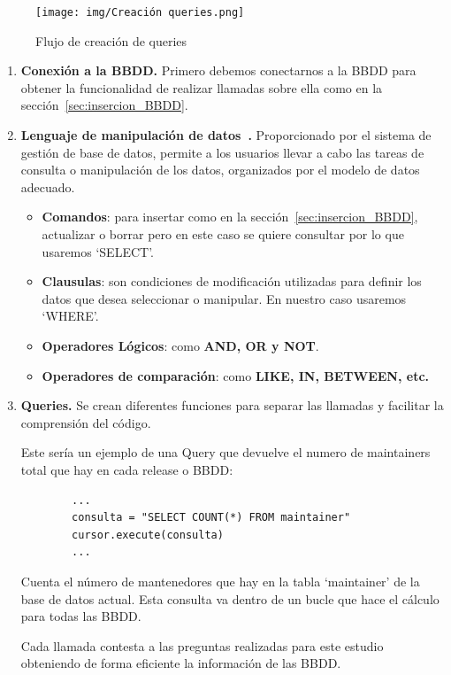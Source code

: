 \documentclass[a4paper, 12pt]{book}
\begin{document}
\begin{figure}
	\centering
	\texttt{[image: img/Creación queries.png]}
	\caption{Flujo de creación de queries}
	\label{fig:flujo creacion queries}
\end{figure}

\begin{enumerate}
	\item \textbf{Conexión a la BBDD.} Primero debemos conectarnos a la BBDD para obtener la funcionalidad de realizar llamadas sobre ella como en la sección~\ref{sec:insercion_BBDD}.
	
	\item \textbf{Lenguaje de manipulación de datos~\cite{geotalleres:_sql}.} Proporcionado por el sistema de gestión de base de datos, permite a los usuarios llevar a cabo las tareas de consulta o manipulación de los datos, organizados por el modelo de datos adecuado. 

	\begin{itemize}
		\item \textbf{Comandos}: para insertar como en la sección~\ref{sec:insercion_BBDD}, actualizar o borrar pero en este caso se quiere consultar por lo que usaremos `SELECT'.
		
		\item \textbf{Clausulas}: son condiciones de modificación utilizadas para definir los datos que desea seleccionar o manipular. En nuestro caso usaremos `WHERE'.
		
		\item \textbf{Operadores Lógicos}: como \textbf{AND, OR y NOT}.
		
		\item \textbf{Operadores de comparación}: como \textbf{LIKE, IN, BETWEEN, etc.}
		
	\end{itemize}
	
	\item \textbf{Queries.} Se crean diferentes funciones para separar las llamadas y facilitar la comprensión del código. 
	
	
	
	Este sería un ejemplo de una Query que devuelve el numero de maintainers total que hay en cada release o BBDD:
	
	\begin{verbatim}
		...
		consulta = "SELECT COUNT(*) FROM maintainer"
		cursor.execute(consulta)
		...
	\end{verbatim} 
	
	Cuenta el número de mantenedores que hay en la tabla `maintainer' de la base de datos actual. Esta consulta va dentro de un bucle que hace el cálculo para todas las BBDD.
	
	Cada llamada contesta a las preguntas realizadas para este estudio obteniendo de forma eficiente la información de las BBDD.
	 
\end{enumerate}
\end{document}
